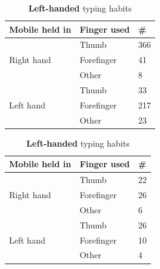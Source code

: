     \begin{table}[H]
      \parbox{.5\linewidth}{
        \centering
        \begin{tabular}{ l | l | l }
          \hline
          {\bf Mobile held in} & {\bf Finger used} & {\bf \#} \\ \hline
          \multirow{3}{*}{Right hand} & Thumb & 366 \\
          & Forefinger & 41 \\
          & Other & 8 \\ \hline
          \multirow{3}{*}{Left hand} & Thumb & 33 \\
          & Forefinger & 217 \\
          & Other & 23 \\ \hline
        \end{tabular}
        \caption{{\bf Right-handed} typing habits}
        \label{tab:righthandfinger}
      }
      \hfill
      \parbox{.5\linewidth}{
        \centering
        \begin{tabular}{ l | l | l }
          \hline
          {\bf Mobile held in} & {\bf Finger used} & {\bf \#} \\ \hline
          \multirow{3}{*}{Right hand} & Thumb & 22 \\ 
          & Forefinger & 26 \\
          & Other & 6 \\ \hline
          \multirow{3}{*}{Left hand} & Thumb & 26 \\ 
          & Forefinger & 10 \\
          & Other & 4 \\ \hline
        \end{tabular}
        \caption{{\bf Left-handed} typing habits}
        \label{tab:lefthandfinger}
      }
    \end{table}

